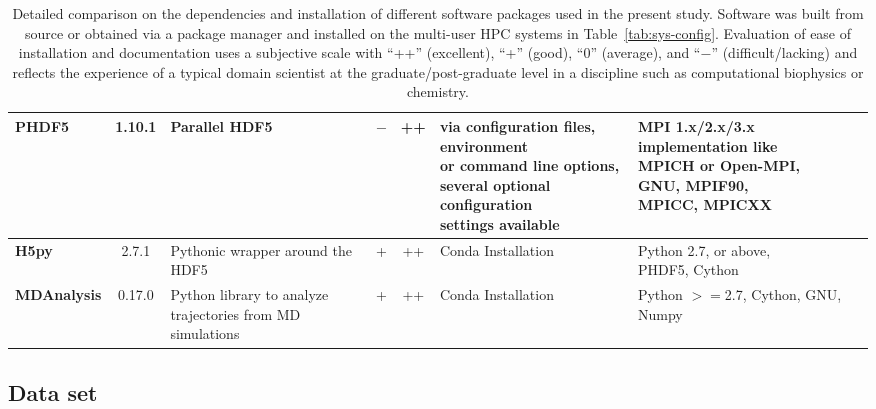 \begin{table}[ht!]
\begin{adjustbox}{max width=\textwidth}
\begin{tabular}{l c l c c l l}
   \midrule
   \bfseries PHDF5 & 1.10.1 & Parallel HDF5 & $-$ & ++ & \makecell[l]{via configuration files,\\ environment \\or command line options, \\ several optional configuration\\ settings available} &\makecell[l]{MPI 1.x/2.x/3.x  \\ implementation like \\ MPICH or Open-MPI,  \\GNU, MPIF90,  \\MPICC, MPICXX}\\
   \midrule
   \bfseries H5py &  2.7.1 & Pythonic wrapper around the HDF5 & + & ++ & Conda Installation & \makecell[l]{Python 2.7, or above,\\ PHDF5, Cython}\\    
   \midrule
   \bfseries MDAnalysis & 0.17.0 & \makecell[l]{Python library to analyze \\trajectories from MD simulations} & + & ++ & Conda Installation & \makecell[l]{Python $>=$2.7, Cython,\\ GNU, Numpy}\\
  \bottomrule
\end{tabular}
\end{adjustbox}
\caption[Version of the packages used in the present study]%
{Detailed comparison on the dependencies and installation of different software packages used in the present study. Software was built from source or obtained via a package manager and installed on the multi-user HPC systems in Table~\protect\ref{tab:sys-config}. Evaluation of ease of installation and documentation uses a subjective scale with ``++'' (excellent), ``+'' (good), ``0'' (average), and ``$-$'' (difficult/lacking) and reflects the experience of a typical domain scientist at the graduate/post-graduate level in a discipline such as computational biophysics or chemistry.}
\label{tab:version}
\end{table}


\subsection{Data set}
\label{sec:data}

